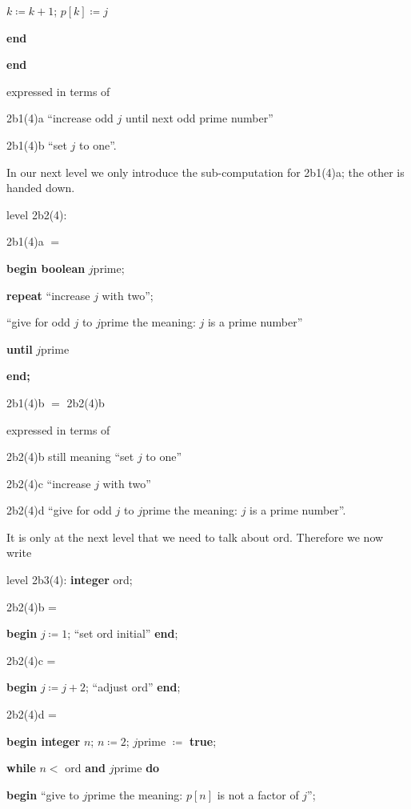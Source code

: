 \documentclass[twoside,11pt]{book}
\begin{document}
\noindent
\quad\quad $k \coloneq k + 1$; $p[k] \coloneq j$

\noindent
\quad\textbf{end}

\noindent
\textbf{end}

\noindent
expressed in terms of

\noindent
2b1(4)a\tabto{5em} ``increase odd $j$ until next odd prime number''

\noindent
2b1(4)b\tabto{5em} ``set $j$ to one''.

In our next level we only introduce the sub-computation for 2b1(4)a; the other is handed down.

\noindent
level 2b2(4):

\noindent
2b1(4)a $=$

\noindent
\textbf{begin boolean} $j$prime;

\noindent
\quad\textbf{repeat} ``increase $j$ with two'';

\noindent
\quad\quad ``give for odd $j$ to $j$prime the meaning: $j$ is a prime number''

\noindent
\quad\textbf{until} $j$prime

\noindent
\textbf{end;}

\noindent
2b1(4)b $=$ 2b2(4)b

\noindent
expressed in terms of

\noindent
2b2(4)b\tabto{5em} still meaning ``set $j$ to one''

\noindent
2b2(4)c\tabto{5em} ``increase $j$ with two''

\noindent
2b2(4)d\tabto{5em} ``give for odd $j$ to $j$prime the meaning: $j$ is a prime number''.

It is only at the next level that we need to talk about ord. Therefore we now write

\noindent
level 2b3(4): \textbf{integer} ord;

\noindent
2b2(4)b =

\noindent
\textbf{begin} $j \coloneq 1$; ``set ord initial'' \textbf{end};

\noindent
2b2(4)c =

\noindent
\textbf{begin} $j \coloneq j + 2$; ``adjust ord'' \textbf{end};

\noindent
2b2(4)d =

\noindent
\textbf{begin integer} $n$; $n \coloneq 2$; $j$prime $\coloneq$ \textbf{true};

\noindent
\quad\textbf{while} $n <$ ord \textbf{and} $j$prime \textbf{do}

\noindent
\quad\quad\textbf{begin} ``give to $j$prime the meaning: $p[n]$ is not a factor of $j$'';
\end{document}
